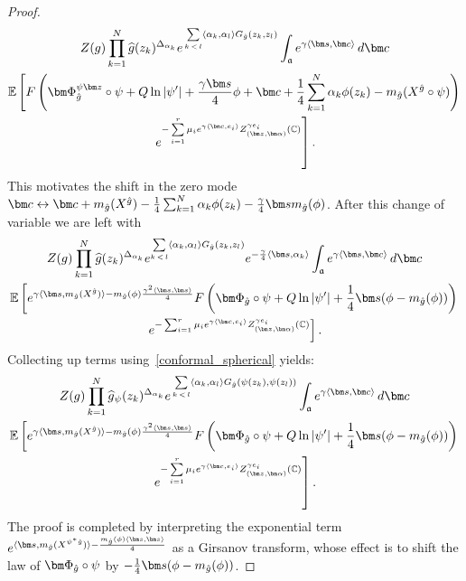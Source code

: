 \documentclass[AHL,Unicode,longabstracts,published]{cedram}
\newcommand{\frka}{\mathfrak{a}}
\newcommand{\C}{\mathbb{C}}
\newcommand{\E}{\mathbb{E}}
\newcommand{\ps}[1]{\langle #1 \rangle}
\newcommand*\green[1]{#1}
\newcommand{\norm}[1]{\left\lvert#1\right\rvert}
\let\oldhat\hat
\renewcommand*{\hat}[1]{\mathchoice{\widehat{#1}}{\widehat{#1}}{\oldhat{#1}}{\oldhat{#1}}}
\begin{document}
\begin{proof}
\begin{multline*}
Z(g)\prod_{k=1}^N \hat g (z_k)^{\Delta_{\alpha_k}}e^{\,\sum\limits_{ k\,<\,l} \langle\alpha_k,\alpha_l \rangle G_{\hat g}(z_k,z_l) }\int_{ \frka} e^{\gamma \ps{\bm s,\bm c}}\,d\bm c\\
\E \left [F\left(\bm\Phi_{\hat g}^{\psi\bm z}\circ\psi+ Q\ln\norm{\psi'}+\frac{\gamma \bm s}{4}\phi+\bm c+\frac14\sum_{k=1}^N\alpha_k\phi(z_k)-m_{\hat g}(X^{\hat g}\circ\psi)\right)\right.\\
\left. e^{- \sum\limits_{i=1}^{r} \mu_i e^{\gamma \langle \bm c,e_i\rangle }Z_{(\bm z,\bm \alpha)}^{\gamma e_i} (\C)} \right].
\end{multline*}
This motivates the shift in the zero mode $\bm c\leftrightarrow\bm c+ m_{\hat g}(X^{\hat g})-\frac14\sum_{k=1}^N\alpha_k\phi(z_k)-\frac\gamma4\bm sm_{\hat g}(\phi)$. After this change of variable we are left with
\begin{multline*}
Z(g)\prod_{k=1}^N \hat g (z_k)^{\Delta_{\alpha_k}}e^{ \sum\limits_{ k\,<\,l} \langle\alpha_k,\alpha_l \rangle G_{\hat g}(z_k,z_l) }e^{-\frac{\gamma}{4}\ps{\bm s,\alpha_k}}\int_{ \frka} e^{\gamma \ps{\bm s,\bm c}}\,d\bm c \\
\E \left [e^{\gamma\ps{\bm s,m_{\hat g}(X^{\hat g})}-m_{\hat g}(\phi)\frac{\gamma^2\ps{\bm s,\bm s}}4}F\left(\bm\Phi_{\hat g}\circ\psi+ Q\ln\norm{\psi'}+\frac14\bm s(\phi-m_{\hat g}(\phi))\right)\right.\\
\left. e^{- \sum_{i=1}^{r} \mu_i e^{\gamma \langle \bm c,e_i\rangle }Z_{(\bm z,\bm \alpha)}^{\gamma e_i} (\C)} \right].
\end{multline*}
Collecting up terms using~\eqref{conformal_spherical} yields:
\begin{multline*}
Z(g)\prod_{k=1}^N \hat g_\psi (z_k)^{\Delta_{\alpha_k}}e^{\,\sum\limits_{ k\,<\,l} \langle\alpha_k,\alpha_l \rangle G_{\hat g}(\psi(z_k),\psi(z_l)) }\int_{ \frka} e^{\green\gamma\ps{\bm s,\bm c}}\,d\bm c\\
\E \left [e^{\green\gamma\ps{\bm s,m_{\hat g}(X^{\hat g})}-m_{\hat g}(\phi)\frac{\gamma^2\ps{\bm s,\bm s}}4} F\left(\bm\Phi_{\hat g}\circ\psi+ Q\ln\norm{\psi'}+\frac14\bm s(\phi-m_{\hat g}(\phi))\right)\right.\\
\left. e^{- \sum\limits_{i=1}^{r} \mu_i e^{\gamma \langle \bm c,e_i\rangle }Z_{(\bm z,\bm \alpha)}^{\gamma e_i} (\C)} \right].
\end{multline*}
The proof is completed by interpreting the exponential term $e^{\ps{\bm s,m_{\hat g}(X^{\psi^*\hat g})}-\frac{m_{\hat g}(\phi)\ps{\bm s,\bm s}}4}$ as a Girsanov transform, whose effect is to shift the law of $\bm\Phi_{\hat g}\circ\psi$ by $-\frac14\bm s(\phi-m_{\hat g}(\phi))$.
\end{proof}
\end{document}
